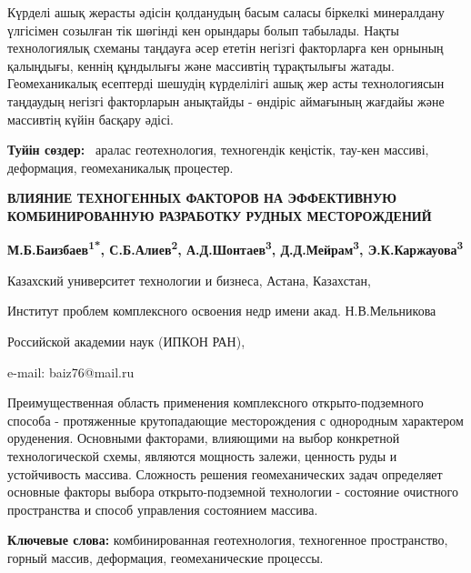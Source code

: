 \hspace{1.5em} Күрделі ашық жерасты әдісін қолданудың басым саласы біркелкі минералдану
үлгісімен созылған тік шөгінді кен орындары болып табылады. Нақты
технологиялық схеманы таңдауға әсер ететін негізгі факторларға кен
орнының қалыңдығы, кеннің құндылығы және массивтің тұрақтылығы жатады.
Геомеханикалық есептерді шешудің күрделілігі ашық жер асты технологиясын
таңдаудың негізгі факторларын анықтайды - өндіріс аймағының жағдайы және
массивтің күйін басқару әдісі.

\hspace{1.5em} {\bfseries Туйін сөздер:} \emph{~}аралас геотехнология, техногендік
кеңістік, тау-кен массиві, деформация, геомеханикалық процестер.

\begin{center}
{\large\bfseries ВЛИЯНИЕ ТЕХНОГЕННЫХ ФАКТОРОВ НА ЭФФЕКТИВНУЮ КОМБИНИРОВАННУЮ РАЗРАБОТКУ РУДНЫХ МЕСТОРОЖДЕНИЙ}

{\bfseries М.Б.Баизбаев\textsuperscript{1*}, С.Б.Алиев\textsuperscript{2},
А.Д.Шонтаев\textsuperscript{3}, Д.Д.Мейрам\textsuperscript{3},
Э.К.Каржауова\textsuperscript{3}}

Казахский университет технологии и бизнеса, Астана, Казахстан,

Институт проблем комплексного освоения недр имени акад. Н.В.Мельникова

Российской академии наук (ИПКОН РАН),

e-mail: baiz76@mail.ru
\end{center}

\hspace{1.5em} Преимущественная область применения комплексного открыто-подземного
способа - протяженные крутопадающие месторождения с однородным
характером оруденения. Основными факторами, влияющими на выбор
конкретной технологической схемы, являются мощность залежи, ценность
руды и устойчивость массива. Сложность решения геомеханических задач
определяет основные факторы выбора открыто-подземной технологии -
состояние очистного пространства и способ управления состоянием массива.

\hspace{1.5em} {\bfseries Ключевые слова:} комбинированная геотехнология, техногенное
пространство, горный массив, деформация, геомеханические процессы.

